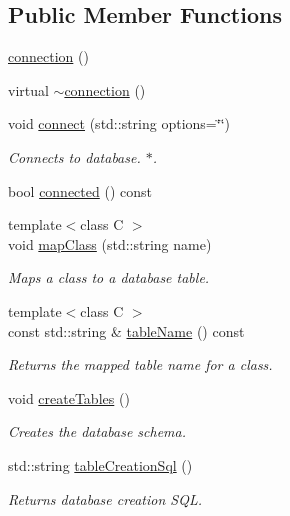 \subsection*{Public Member Functions}
\begin{DoxyCompactItemize}
\item 
\hyperlink{classdbo_1_1connection_abf4fbe074e578b5744dc6dc8e595d8e8}{connection} ()
\item 
virtual \hyperlink{classdbo_1_1connection_a974638af9e9e1e5659dee7c9fab326ed}{$\sim$connection} ()
\item 
void \hyperlink{classdbo_1_1connection_aae5734a1ebadaf2597d9172c5ab7115a}{connect} (std\+::string options=\char`\"{}\char`\"{})
\begin{DoxyCompactList}\small\item\em Connects to database. $\ast$. \end{DoxyCompactList}\item 
bool \hyperlink{classdbo_1_1connection_a1a68a49bf2ce826eaa08d1eb2527b454}{connected} () const 
\item 
{\footnotesize template$<$class C $>$ }\\void \hyperlink{classdbo_1_1connection_a78a8ab8b3fa23d45c96d75b906652e86}{map\+Class} (std\+::string name)
\begin{DoxyCompactList}\small\item\em Maps a class to a database table. \end{DoxyCompactList}\item 
{\footnotesize template$<$class C $>$ }\\const std\+::string \& \hyperlink{classdbo_1_1connection_ade1cbdc41769464cd1076e09c2099c9a}{table\+Name} () const 
\begin{DoxyCompactList}\small\item\em Returns the mapped table name for a class. \end{DoxyCompactList}\item 
void \hyperlink{classdbo_1_1connection_a35c81eabb228750f0e4c517eb63d6de2}{create\+Tables} ()
\begin{DoxyCompactList}\small\item\em Creates the database schema. \end{DoxyCompactList}\item 
std\+::string \hyperlink{classdbo_1_1connection_a5105d77e3a30044c0a97cdd42c8dbc62}{table\+Creation\+Sql} ()
\begin{DoxyCompactList}\small\item\em Returns database creation S\+Q\+L. \end{DoxyCompactList}\item 

\end{DoxyCompactItemize}
